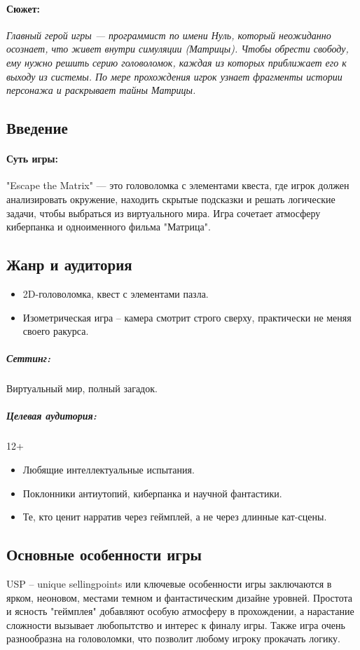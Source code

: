 \documentclass{article}
\begin{document}
\paragraph{\textbf{Сюжет:}}
\textit{Главный герой игры — программист по имени Нуль, который неожиданно осознает, что живет внутри симуляции (Матрицы). Чтобы обрести свободу, ему нужно решить серию головоломок, каждая из которых приближает его к выходу из системы. По мере прохождения игрок узнает фрагменты истории персонажа и раскрывает тайны Матрицы.
}

\subsection{Введение}

\paragraph{\textbf{Суть игры:}}
"Escape the Matrix" — это головоломка с элементами квеста, где игрок должен анализировать окружение, находить скрытые подсказки и решать логические задачи, чтобы выбраться из виртуального мира. Игра сочетает атмосферу киберпанка и одноименного фильма "Матрица".

\subsection{Жанр и аудитория}
\begin{itemize}
\item 2D-головоломка, квест с элементами пазла.
\item Изометрическая игра – камера смотрит строго сверху, практически не меняя своего ракурса.
\end{itemize}

\subparagraph{Сеттинг:} Виртуальный мир, полный загадок.
\subparagraph{Целевая аудитория:} 12+ 
\begin{itemize}
\item Любящие интеллектуальные испытания.
\item Поклонники антиутопий, киберпанка и научной фантастики.
\item Те, кто ценит нарратив через геймплей, а не через длинные кат-сцены.
\end{itemize}
\subsection{Основные особенности игры}
USP – unique sellingpoints или ключевые особенности игры заключаются в ярком, неоновом, местами темном и фантастическим дизайне уровней. Простота и ясность "геймплея" добавляют особую атмосферу в прохождении, а нарастание сложности вызывает любопытство и интерес к финалу игры.
Также игра очень разнообразна на головоломки, что позволит любому игроку прокачать логику. 
\end{document}
